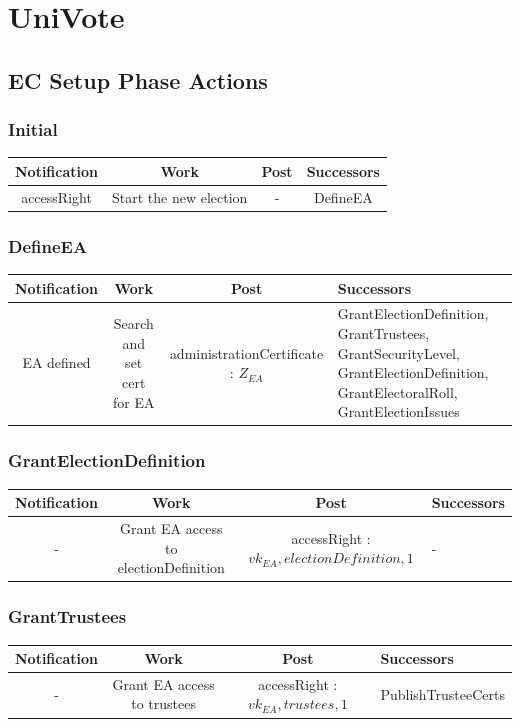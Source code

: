 \documentclass[bibtotoc,halfparskip,oneside]{scrreprt}
\begin{document}
	
	\chapter{UniVote}
	
	
	\begin{landscape}
		\section{EC Setup Phase Actions}
		\subsection{Initial}
		\begin{tabular}{|c|c|c|c|}
			\hline Notification & Work & Post & Successors\\ 
			\hline accessRight & Start the new election & -  & DefineEA \\  
			\hline 
		\end{tabular} 
		\subsection{DefineEA}
		\begin{tabularx}{\linewidth}{|c|c|c|X|}
			\hline Notification & Work & Post & Successors\\ 
			\hline EA defined & Search and set cert for EA & administrationCertificate : $Z_{EA}$ & GrantElectionDefinition, GrantTrustees, GrantSecurityLevel, GrantElectionDefinition, GrantElectoralRoll, GrantElectionIssues \\ 
			\hline 
		\end{tabularx} 
		\subsection{GrantElectionDefinition}
		\begin{tabularx}{\linewidth}{|c|c|c|X|}
			\hline Notification & Work & Post & Successors\\ 
			\hline - & Grant EA access to electionDefinition & accessRight : $vk_{EA} , electionDefinition  ,1 $ & - \\ 
			\hline 
		\end{tabularx}
		\subsection{GrantTrustees}
		\begin{tabularx}{\linewidth}{|c|c|c|X|}
			\hline Notification & Work & Post & Successors\\ 
			\hline - & Grant EA access to trustees & accessRight : $vk_{EA} , trustees, 1 $ & PublishTrusteeCerts \\  
			\hline 
			\end{tabularx}
		

\end{landscape}
\end{document}
